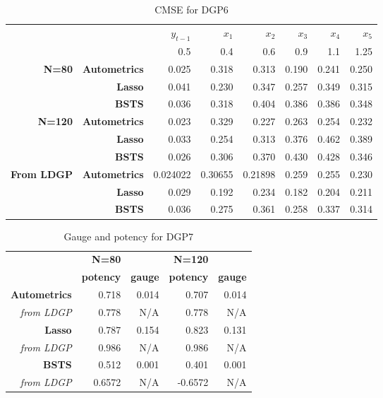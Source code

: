 \documentclass[11pt, oneside]{book}   	%
\begin{document}
\begin{table}[htbp]
  \centering

    \begin{tabular}{rrrrrrrr}
  
          &       & $y_{t-1}$ & $x_{1}$ & $x_{2}$ & $x_{3}$ & $x_{4}$ & $x_{5}$ \\

          &       & 0.5 & 0.4&0.6 &0.9&1.1  &1.25  \\
    \textbf{N=80} & \textbf{Autometrics} & 0.025 & 0.318 & 0.313 & 0.190 & 0.241 & 0.250 \\
    \textbf{} & \textbf{Lasso} & 0.041 & 0.230 & 0.347 & 0.257 & 0.349 & 0.315 \\
    \textbf{} & \textbf{BSTS} & 0.036 & 0.318 & 0.404 & 0.386 & 0.386 & 0.348 \\
    \textbf{N=120} & \textbf{Autometrics} & 0.023 & 0.329 & 0.227 & 0.263 & 0.254 & 0.232 \\
    \textbf{} & \textbf{Lasso} & 0.033 & 0.254 & 0.313 & 0.376 & 0.462 & 0.389 \\
    \textbf{} & \textbf{BSTS} & 0.026 & 0.306 & 0.370 & 0.430 & 0.428 & 0.346 \\
    \textbf{From LDGP} & \textbf{Autometrics} & 0.024022 & 0.30655 & 0.21898 & 0.259 & 0.255 & 0.230 \\
          & \textbf{Lasso} & 0.029 & 0.192 & 0.234 & 0.182 & 0.204 & 0.211\\
          & \textbf{BSTS} & 0.036 & 0.275 & 0.361 & 0.258 & 0.337 & 0.314 \\
 
    \end{tabular}%
      \caption{CMSE for DGP6}
  \label{DGP6CMSE}%
\end{table}%


\begin{table}[htbp]
  \centering
 
    \begin{tabular}{rrrrr}

          & \textbf{N=80} & \textbf{} & \textbf{N=120} & \textbf{} \\

          & \textbf{potency} & \textbf{gauge} & \textbf{potency} & \textbf{gauge} \\
    \textbf{Autometrics} & 0.718 & 0.014 & 0.707 & 0.014 \\
    \textit{from LDGP} & 0.778 & N/A   & 0.778 & N/A \\
    \textbf{Lasso} & 0.787 & 0.154 & 0.823 & 0.131 \\
    \textit{from LDGP} & 0.986 & N/A   & 0.986 & N/A \\
    \textbf{BSTS} & 0.512 & 0.001 & 0.401 & 0.001 \\
    \textit{from LDGP} & 0.6572 & N/A   & -0.6572 & N/A \\

    \end{tabular}%
     \caption{Gauge and potency for DGP7}
  \label{DGP7GP}%
\end{table}%
\end{document}
